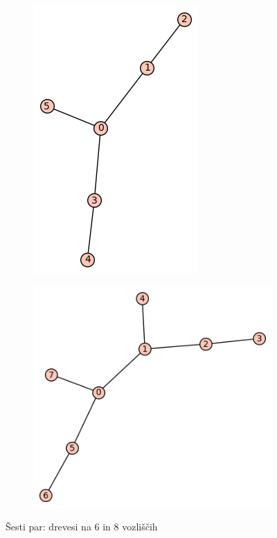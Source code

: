 \documentclass[12pt, a4paper]{article}
\begin{document}
\begin{center}
\begin{center}
\begin{figure}[!htb]
\centering
\begin{subfigure}{0.5\textwidth}
  \centering
  \includegraphics[width=0.4\linewidth]{t-11}
\end{subfigure}%
\begin{subfigure}{0.5\textwidth}
  \centering
  \includegraphics[width=0.5\linewidth]{t-30}
\end{subfigure}
\caption{Šesti par: drevesi na 6 in 8 vozliščih}
\label{fig:test}
\end{figure}
\end{center}


\end{center}
\end{document}
